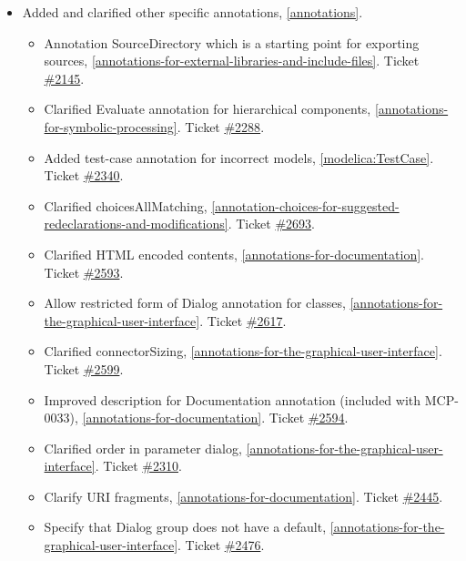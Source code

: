 \begin{itemize}
\item Added and clarified other specific annotations, \cref{annotations}.
\begin{itemize}
\item Annotation SourceDirectory which is a starting point for exporting sources, \cref{annotations-for-external-libraries-and-include-files}.
Ticket \href{https://github.com/modelica/ModelicaSpecification/issues/2145}{\#2145}.
\item Clarified Evaluate annotation for hierarchical components, \cref{annotations-for-symbolic-processing}.
Ticket \href{https://github.com/modelica/ModelicaSpecification/issues/2288}{\#2288}.
\item Added test-case annotation for incorrect models, \cref{modelica:TestCase}.
Ticket \href{https://github.com/modelica/ModelicaSpecification/issues/2340}{\#2340}.
\item Clarified choicesAllMatching, \cref{annotation-choices-for-suggested-redeclarations-and-modifications}.
Ticket \href{https://github.com/modelica/ModelicaSpecification/issues/2693}{\#2693}.
\item Clarified HTML encoded contents, \cref{annotations-for-documentation}.
Ticket \href{https://github.com/modelica/ModelicaSpecification/pull/2593}{\#2593}.
\item Allow restricted form of Dialog annotation for classes, \cref{annotations-for-the-graphical-user-interface}.
Ticket \href{https://github.com/modelica/ModelicaSpecification/issues/2617}{\#2617}.
\item Clarified connectorSizing, \cref{annotations-for-the-graphical-user-interface}.
Ticket \href{https://github.com/modelica/ModelicaSpecification/pull/2599}{\#2599}.
\item Improved description for Documentation annotation (included with MCP-0033), \cref{annotations-for-documentation}.
Ticket \href{https://github.com/modelica/ModelicaSpecification/pull/2594}{\#2594}.
\item Clarified order in parameter dialog, \cref{annotations-for-the-graphical-user-interface}.
Ticket \href{https://github.com/modelica/ModelicaSpecification/issues/2310}{\#2310}.
\item Clarify URI fragments, \cref{annotations-for-documentation}.
Ticket \href{https://github.com/modelica/ModelicaSpecification/issues/2445}{\#2445}.
\item Specify that Dialog group does not have a default, \cref{annotations-for-the-graphical-user-interface}.
Ticket \href{https://github.com/modelica/ModelicaSpecification/issues/2476}{\#2476}.

\end{itemize}
\end{itemize}
